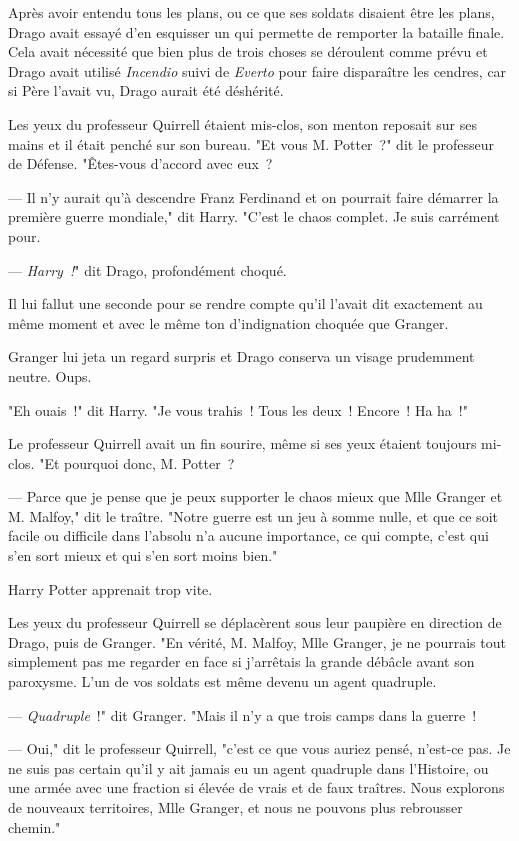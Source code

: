 Après avoir entendu tous les plans, ou ce que ses soldats disaient être les plans, Drago avait essayé d'en esquisser un qui permette de remporter la bataille finale. Cela avait nécessité que bien plus de trois choses se déroulent comme prévu et Drago avait utilisé \emph{Incendio} suivi de \emph{Everto} pour faire disparaître les cendres, car si Père l'avait vu, Drago aurait été déshérité.

Les yeux du professeur Quirrell étaient mis-clos, son menton reposait sur ses mains et il était penché sur son bureau. "Et vous M. Potter~?" dit le professeur de Défense. "Êtes-vous d'accord avec eux~?

--- Il n'y aurait qu'à descendre Franz Ferdinand et on pourrait faire démarrer la première guerre mondiale," dit Harry. "C'est le chaos complet. Je suis carrément pour.

--- \emph{Harry~!}" dit Drago, profondément choqué.

Il lui fallut une seconde pour se rendre compte qu'il l'avait dit exactement au même moment et avec le même ton d'indignation choquée que Granger.

Granger lui jeta un regard surpris et Drago conserva un visage prudemment neutre. Oups.

"Eh ouais~!" dit Harry. "Je vous trahis~! Tous les deux~! Encore~! Ha ha~!"

Le professeur Quirrell avait un fin sourire, même si ses yeux étaient toujours mi-clos. "Et pourquoi donc, M. Potter~?

--- Parce que je pense que je peux supporter le chaos mieux que Mlle Granger et M. Malfoy," dit le traître. "Notre guerre est un jeu à somme nulle, et que ce soit facile ou difficile dans l'absolu n'a aucune importance, ce qui compte, c'est qui s'en sort mieux et qui s'en sort moins bien."

Harry Potter apprenait trop vite.

Les yeux du professeur Quirrell se déplacèrent sous leur paupière en direction de Drago, puis de Granger. "En vérité, M. Malfoy, Mlle Granger, je ne pourrais tout simplement pas me regarder en face si j'arrêtais la grande débâcle avant son paroxysme. L'un de vos soldats est même devenu un agent quadruple.

--- \emph{Quadruple}~!" dit Granger. "Mais il n'y a que trois camps dans la guerre~!

--- Oui," dit le professeur Quirrell, "c'est ce que vous auriez pensé, n'est-ce pas. Je ne suis pas certain qu'il y ait jamais eu un agent quadruple dans l'Histoire, ou une armée avec une fraction si élevée de vrais et de faux traîtres. Nous explorons de nouveaux territoires, Mlle Granger, et nous ne pouvons plus rebrousser chemin."

